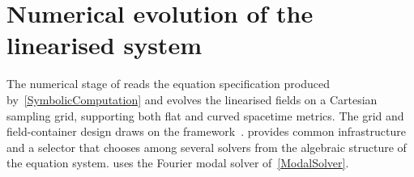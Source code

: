 
\section{Numerical evolution of the linearised system}%
\label{NumericalEvolution}

The numerical stage of \TIDAL{} reads the
equation specification produced by~\cref{SymbolicComputation} and
evolves the linearised fields on a Cartesian sampling grid,
supporting both flat and curved spacetime metrics. The grid and
field-container design draws on the \pypde{}
framework~\cite{zwicker2020pypde}. \TIDAL{} provides common
infrastructure and a selector that chooses
among several solvers from the algebraic structure of the
equation system.  uses the Fourier modal solver
of~\cref{ModalSolver}.


